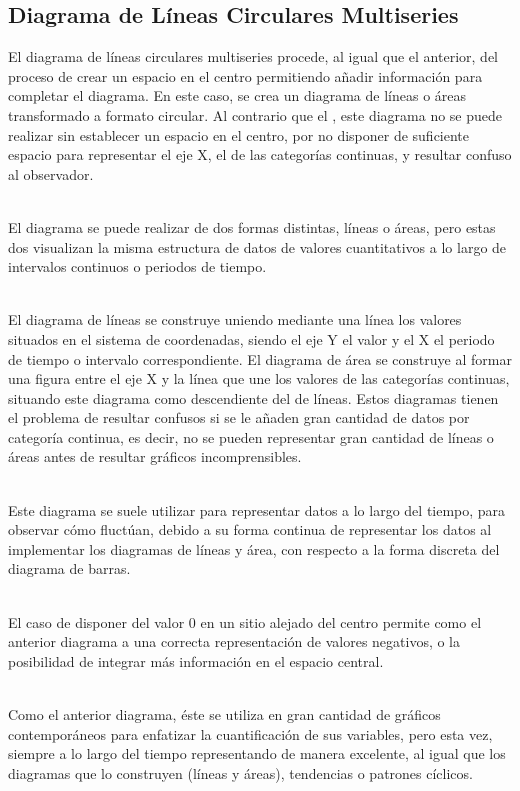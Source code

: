 \documentclass{article}\usepackage[]{graphicx}\usepackage[]{color}
\begin{document}
\subsection{Diagrama de L\'ineas Circulares Multiseries}
El diagrama de l\'ineas circulares multiseries procede, al igual que el anterior, del proceso de crear un espacio en el centro permitiendo a\~nadir informaci\'on para completar el diagrama. En este caso, se crea un diagrama de l\'ineas o \'areas transformado a formato circular. Al contrario que el , este diagrama no se puede realizar sin establecer un espacio en el centro, por no disponer de suficiente espacio para representar el eje X, el de las categor\'ias continuas, y resultar confuso al observador.~\\~\par
El diagrama se puede realizar de dos formas distintas, l\'ineas o \'areas, pero estas dos visualizan la misma estructura de datos de valores cuantitativos a lo largo de intervalos continuos o periodos de tiempo\cite{historia-barras}.~\\~\par
El diagrama de l\'ineas se construye uniendo mediante una l\'inea los valores situados en el sistema de coordenadas, siendo el eje Y el valor y el X el periodo de tiempo o intervalo correspondiente. El diagrama de \'area se construye al formar una figura entre el eje X y la l\'inea que une los valores de las categor\'ias continuas, situando este diagrama como descendiente del de l\'ineas. Estos diagramas tienen el problema de resultar confusos si se le a\~naden gran cantidad de datos por categor\'ia continua, es decir, no se pueden representar gran cantidad de l\'ineas o \'areas antes de resultar gr\'aficos incomprensibles.~\\~\par
Este diagrama se suele utilizar para representar datos a lo largo del tiempo, para observar c\'omo fluct\'uan, debido a su forma continua de representar los datos al implementar los diagramas de l\'ineas y \'area, con respecto a la forma discreta del diagrama de barras.~\\~\par
El caso de disponer del valor 0 en un sitio alejado del centro permite como el anterior diagrama a una correcta representaci\'on de valores negativos, o la posibilidad de integrar m\'as informaci\'on en el espacio central.~\\~\par
Como el anterior diagrama, \'este se utiliza en gran cantidad de gr\'aficos contempor\'aneos\cite{line-example} para enfatizar la cuantificaci\'on de sus variables, pero esta vez, siempre a lo largo del tiempo representando de manera excelente, al igual que los diagramas que lo construyen (l\'ineas y \'areas), tendencias o patrones c\'iclicos.
\end{document}
